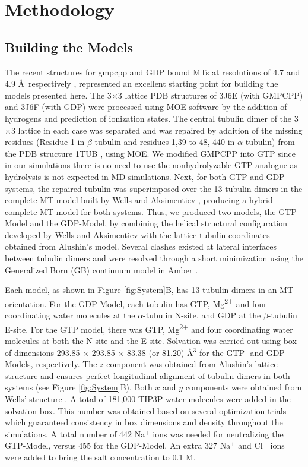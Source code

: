 \documentclass[11pt]{report}
\begin{document}
\section{Methodology}
\label{Methods}

\subsection{Building the Models} 
\label{Methods_buildMod}
The recent structures for \gls{gmpcpp} and GDP bound MTs at resolutions of 4.7 and 4.9 \AA\ respectively
\cite{Alushin2014}, represented
an excellent starting point for building the models presented here. The 3$\times$3 lattice 
PDB structures of 3J6E (with GMPCPP) and 3J6F (with GDP) were
processed using MOE software \cite{moe} by the addition of hydrogens
and prediction of ionization states. The central tubulin dimer of the 
3$\times$3 lattice in each case was separated and was repaired by addition 
of the missing residues (Residue 1 in $\beta$-tubulin and residues 1,39 to 48, 440
in $\alpha$-tubulin) from the PDB structure 1TUB \cite{Nogales1998},
using MOE. We modified GMPCPP into GTP since in our simulations there is no
need to use the nonhydrolyzable GTP analogue as hydrolysis is not
expected in MD simulations. Next, for both GTP and GDP systems, the repaired
tubulin was superimposed over the 13 tubulin dimers in the complete
MT model built by Wells and Aksimentiev \cite{Wells2010}, producing 
a hybrid complete MT model for both systems. Thus,
we produced two models, the GTP-Model and the GDP-Model, by combining the 
helical
structural configuration developed by Wells and Aksimentiev
with the lattice tubulin coordinates obtained from Alushin's model.
Several clashes existed at lateral interfaces between tubulin dimers and were
resolved through a short minimization using the Generalized Born (GB) 
continuum model
in Amber \cite{case2012}.

Each model, as shown in Figure \ref{fig:System}B, has 13 tubulin dimers in an MT
orientation. For the GDP-Model, each tubulin has GTP, Mg\textsuperscript{2+} and
four coordinating water molecules at the $\alpha$-tubulin N-site, and GDP at the $\beta$-tubulin E-site.
For the GTP model, there was GTP, Mg\textsuperscript{2+} and
four coordinating water molecules at both the N-site and the E-site. 
Solvation was carried out using box of dimensions 293.85 $\times$ 293.85 $\times$ 83.38 (or 81.20) \AA$^{3}$ for the GTP- and GDP-Models, respectively. The $z$-component was obtained from Alushin's lattice structure 
\cite{Alushin2014} and ensures perfect longitudinal
alignment of tubulin dimers in both systems (see Figure \ref{fig:System}B). 
Both $x$ and $y$ components were obtained from Wells' structure \cite{Wells2010}. 
A total
of 181,000 TIP3P water molecules were added in the solvation box. This number
was obtained based on several optimization trials which 
guaranteed consistency in box dimensions and density throughout the simulations.
A total number of 442 Na$^{+}$ ions was needed for neutralizing the GTP-Model, versus 455 for the GDP-Model. An extra 
327 Na$^{+}$ and Cl$^{-}$ ions were added to bring the salt 
concentration to 0.1 M. 
\end{document}
